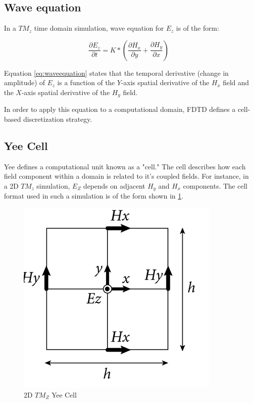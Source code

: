 \subsection{Wave equation}

In a $TM_z$ time domain simulation, wave equation for  $ E_z $ is of the form:

\begin{equation} \label{eq:waveequation} 
\frac{\partial E_z}{\partial t} = K * (\frac{\partial H_x}{\partial y} + \frac{\partial H_y}{\partial x})
\end{equation}

Equation \ref{eq:waveequation} states that the temporal derivative (change in amplitude) of $E_z$ is a function of the $Y$-axis spatial derivative of the $H_x$ field and the $X$-axis spatial derivative of the $H_y$ field.


In order to apply this equation to a computational domain, FDTD defines a cell-based discretization strategy.

\subsection{Yee Cell}

Yee \cite{Yee} defines a computational unit known as a "cell." The cell describes how each field component within a domain is related to it's coupled fields. For instance, in a 2D $TM_z$ simulation, $E_Z$ depends on adjacent $H_y$ and $H_x$ components. The cell format used in such a simulation is of the form shown in \ref{fig:yeecell}.

\begin{figure}[H]
	\centering
	\includegraphics{yee-cell-ez.png}
	\caption{2D $TM_Z$ Yee Cell}
	\label{fig:yeecell}
\end{figure}

